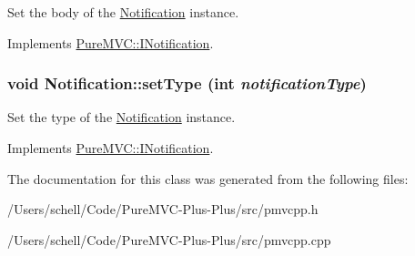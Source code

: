 Set the body of the {\ttfamily \hyperlink{class_pure_m_v_c_1_1_notification}{Notification}} instance. 

Implements \hyperlink{class_pure_m_v_c_1_1_i_notification_a3f5eab942b48a0a8d8045701ed98de83}{PureMVC::INotification}.\hypertarget{class_pure_m_v_c_1_1_notification_aeec90bbe612bca8631ac92c13727feef}{
\subsubsection[{setType}]{\setlength{\rightskip}{0pt plus 5cm}void Notification::setType (int {\em notificationType})}}
\label{class_pure_m_v_c_1_1_notification_aeec90bbe612bca8631ac92c13727feef}


Set the type of the {\ttfamily \hyperlink{class_pure_m_v_c_1_1_notification}{Notification}} instance. 

Implements \hyperlink{class_pure_m_v_c_1_1_i_notification_a2e9d5946b96b759c2f3799377ea4acdc}{PureMVC::INotification}.

The documentation for this class was generated from the following files:\begin{DoxyCompactItemize}
\item 
/Users/schell/Code/PureMVC-\/Plus-\/Plus/src/pmvcpp.h\item 
/Users/schell/Code/PureMVC-\/Plus-\/Plus/src/pmvcpp.cpp\end{DoxyCompactItemize}

